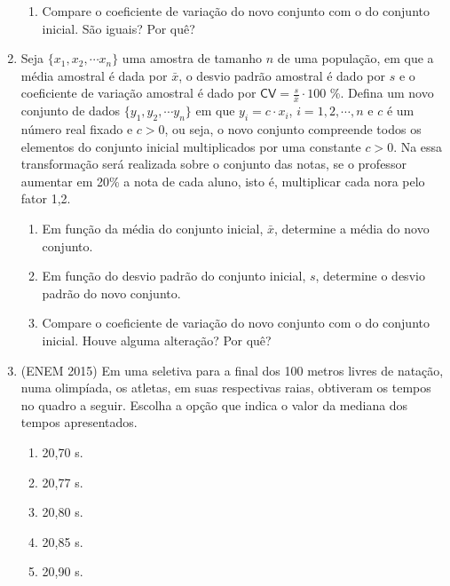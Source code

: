 \begin{enumerate}
\begin{enumerate}
\item {} 
Compare o coeficiente de variação do novo conjunto com o do conjunto inicial. São iguais? Por quê?

\end{enumerate}

\item Seja \(\{x_1,x_2,\cdots x_n\}\) uma amostra de tamanho \(n\) de uma população, em que a média amostral é dada por \(\bar{x}\), o desvio padrão amostral é dado por \(s\) e o coeficiente de variação amostral é dado por \(\textsf{CV}=\frac{s}{\bar{x}}\cdot 100\) \%. Defina um novo conjunto de dados \(\{y_1,y_2,\cdots y_n\}\) em que \(y_i=c\cdot x_i\), \(i=1,2,\cdots, n\) e \(c\) é um número real fixado e \(c>0\), ou seja, o novo conjunto compreende todos os elementos do conjunto inicial multiplicados por uma constante \(c>0.\) Na  essa transformação será realizada sobre o conjunto das notas, se o professor aumentar em 20\% a nota de cada aluno, isto é, multiplicar cada nora pelo fator 1,2.
\begin{enumerate}
\item {} 
Em função da média do conjunto inicial, \(\bar{x}\), determine a média do novo conjunto.

\item {} 
Em função do desvio padrão do conjunto inicial, \(s\), determine o desvio padrão do novo conjunto.

\item {} 
Compare o coeficiente de variação do novo conjunto com o do conjunto inicial. Houve alguma alteração? Por quê?

\end{enumerate}

\item (ENEM 2015) Em uma seletiva para a final dos 100 metros livres de natação, numa olimpíada, os atletas, em suas respectivas raias, obtiveram os tempos no quadro a seguir. Escolha a opção que indica o valor da mediana dos tempos apresentados.
\begin{enumerate}
\item {} 
20,70 s.

\item {} 
20,77 s.

\item {} 
20,80 s.

\item {} 
20,85 s.

\item {} 
20,90 s.


\end{enumerate}
\end{enumerate}
